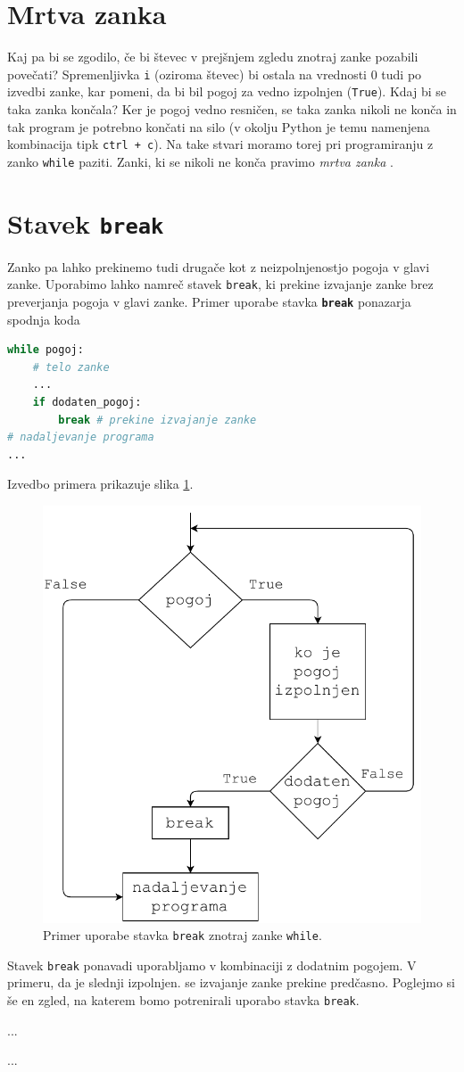 \section{Mrtva zanka}

Kaj pa bi se zgodilo, če bi števec v prejšnjem zgledu znotraj zanke pozabili povečati? Spremenljivka \texttt{i} (oziroma števec) bi ostala na vrednosti 0 tudi po izvedbi zanke, kar pomeni, da bi bil pogoj za vedno izpolnjen (\texttt{True}). Kdaj bi se taka zanka končala? Ker je pogoj vedno resničen, se taka zanka nikoli ne konča in tak program je potrebno končati na silo (v okolju Python je temu namenjena kombinacija tipk \texttt{ctrl + c}). Na take stvari moramo torej pri programiranju z zanko \texttt{while} paziti. Zanki, ki se nikoli ne konča pravimo \emph{mrtva zanka} .

\section{Stavek \texttt{break}}
Zanko pa lahko prekinemo tudi drugače kot z neizpolnjenostjo pogoja v glavi zanke. Uporabimo lahko namreč stavek \texttt{break}, ki prekine izvajanje zanke brez preverjanja pogoja v glavi zanke. Primer uporabe stavka \texttt\textbf{break} ponazarja spodnja koda
\begin{lstlisting}[language=Python]
while pogoj:
    # telo zanke
    ...
    if dodaten_pogoj: 
        break # prekine izvajanje zanke
# nadaljevanje programa
...
\end{lstlisting}
Izvedbo primera prikazuje slika \ref{img:while2}. 
\begin{figure}
    \centering
    \includegraphics[width=0.5\linewidth]{img/while2.pdf}
    \caption{Primer uporabe stavka \texttt{break} znotraj zanke \texttt{while}.}
    \label{img:while2}
\end{figure}

Stavek \texttt{break} ponavadi uporabljamo v kombinaciji z dodatnim pogojem. V primeru, da je slednji izpolnjen. se izvajanje zanke prekine predčasno. Poglejmo si še en zgled, na katerem bomo potrenirali uporabo stavka \texttt{break}. 

\begin{zgled}
...
\end{zgled}
\begin{resitev}
...

\end{resitev}